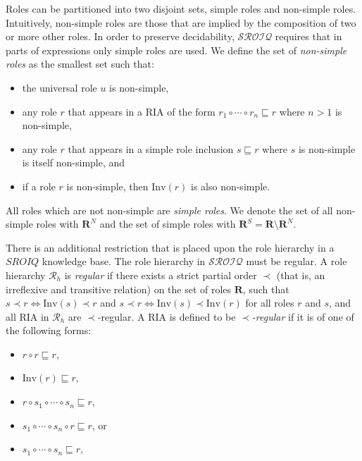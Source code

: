 Roles can be partitioned into two disjoint sets, simple roles and non-simple roles. Intuitively, non-simple roles are those that are implied by the composition of two or more other roles. In order to preserve decidability, $\mathcal{SROIQ}$ requires that in parts of expressions only simple roles are used. We define the set of \emph{non-simple roles} as the smallest set such that:

\begin{itemize}
    \item the universal role $u$ is non-simple,
    \item any role $r$ that appears in a RIA of the form $r_1 \circ \cdots \circ r_n \sqsubseteq r$ where $n > 1$ is non-simple,
    \item any role $r$ that appears in a simple role inclusion $s \sqsubseteq r$ where $s$ is non-simple is itself non-simple, and
    \item if a role $r$ is non-simple, then $\mathrm{Inv}(r)$ is also non-simple.
\end{itemize}

All roles which are not non-simple are \emph{simple roles}. We denote the set of all non-simple roles with $\mathbf{R}^N$ and the set of simple roles with $\mathbf{R}^S = \mathbf{R} \setminus \mathbf{R}^N$.

\begin{example}
\end{example}

There is an additional restriction that is placed upon the role hierarchy in a $SROIQ$ knowledge base. The role hierarchy in $\mathcal{SROIQ}$ must be regular. A role hierarchy $\mathcal{R}_h$ is \emph{regular} if there exists a strict partial order $\prec$ (that is, an irreflexive and transitive relation) on the set of roles $\mathbf{R}$, such that $s \prec r \iff \mathrm{Inv}(s) \prec r$ and $s \prec r \iff \mathrm{Inv}(s) \prec \mathrm{Inv}(r)$ for all roles $r$ and $s$, and all RIA in $\mathcal{R}_h$ are $\prec$-regular. A RIA is defined to be $\prec$\emph{-regular} if it is of one of the following forms:

\begin{itemize}
    \item $r \circ r \sqsubseteq r$,
    \item $\mathrm{Inv}(r) \sqsubseteq r$,
    \item $r \circ s_1 \circ \cdots \circ s_n \sqsubseteq r$,
    \item $s_1 \circ \cdots \circ s_n \circ r \sqsubseteq r$, or
    \item $s_1 \circ \cdots \circ s_n \sqsubseteq r$,
\end{itemize}

